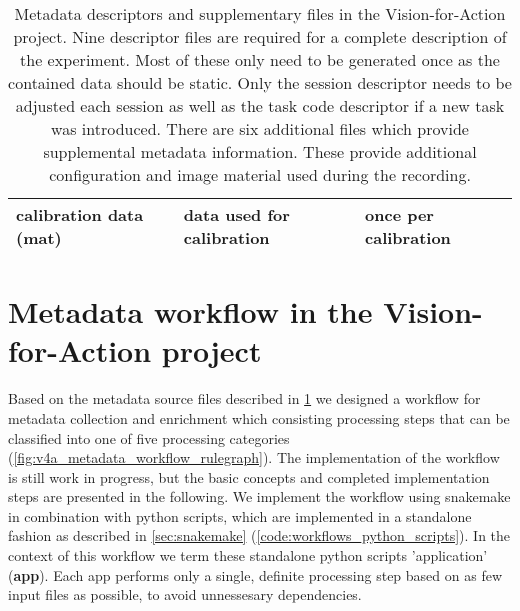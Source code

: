 \begin{table}[]
\begin{tabular}{lll}
\multicolumn{1}{|l|}{calibration data (mat)}       & \multicolumn{1}{l|}{data used for calibration}                                                                         & \multicolumn{1}{l|}{once per calibration}                                            \\ \hline
\end{tabular}
\caption[Metadata files in the Vision-for-Action project]{Metadata descriptors and supplementary files in the Vision-for-Action project. Nine  descriptor files are required for a complete description of the experiment. Most of these only need to be generated once as the contained data should be static. Only the session descriptor needs to be adjusted each session as well as the task code descriptor if a new task was introduced. There are six additional files which provide supplemental metadata information. These provide additional configuration and image material used during the recording.}
\label{tab:v4a_metadata_files}
\end{table}

\section{Metadata workflow in the Vision-for-Action project}

Based on the metadata source files described in \cref{tab:v4a_metadata_files} we designed a workflow for metadata collection and enrichment which consisting processing steps that can be classified into one of five processing categories (\cref{fig:v4a_metadata_workflow_rulegraph}). The implementation of the workflow is still work in progress, but the basic concepts and completed implementation steps are presented in the following. We implement the workflow using snakemake in combination with python scripts, which are implemented in a standalone fashion as described in \cref{sec:snakemake} (\cref{code:workflows_python_scripts}). In the context of this workflow we term these standalone python scripts 'application' (\textbf{app}). Each app performs only a single, definite processing step based on as few input files as possible, to avoid unnessesary dependencies.

